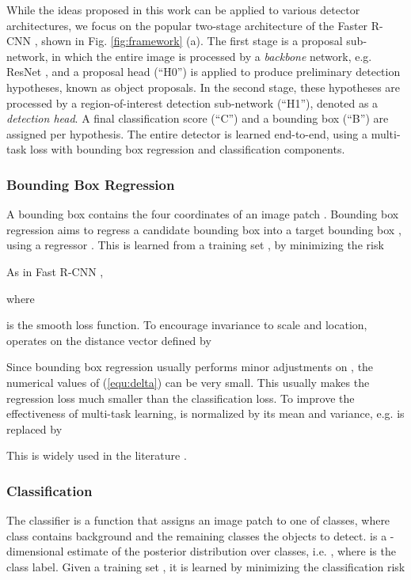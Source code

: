 \documentclass[10pt,journal,compsoc]{IEEEtran}
\begin{document}
While the ideas proposed in this work can be applied
to various detector architectures, we focus on the popular two-stage
architecture of the Faster R-CNN \cite{DBLP:conf/nips/RenHGS15}, shown in
Fig. \ref{fig:framework} (a). The first stage is a proposal sub-network,
in which the entire image is processed by a {\it backbone\/} network,
e.g. ResNet \cite{DBLP:conf/cvpr/HeZRS16}, and a proposal head (``H0'')
is applied to produce preliminary detection hypotheses, known as object
proposals. In the second stage, these
hypotheses are processed by a region-of-interest detection
sub-network (``H1''), denoted as a {\it detection head\/}. A final
classification score (``C'') and a bounding box (``B'') are assigned per
hypothesis. The entire detector is learned end-to-end, using a
multi-task loss with bounding box regression and classification
components.


\subsubsection{Bounding Box Regression}
\label{subsubsec:bbox}

A bounding box  contains the four coordinates of
an image patch . Bounding box regression aims to regress a
candidate bounding box  into a target
bounding box , using a regressor . This is
learned from a training set
, by minimizing the risk

As in Fast R-CNN \cite{DBLP:conf/iccv/Girshick15},

where

is the smooth  loss function.
To encourage invariance to scale and location,  operates on the
distance vector  defined by

Since bounding box regression usually performs minor adjustments
on , the numerical values of (\ref{equ:delta}) can be very
small. This usually makes the regression loss much smaller
than the classification loss. To improve the effectiveness of multi-task
learning,  is normalized by its mean and variance, e.g.
 is replaced by

This is widely used in the literature \cite{DBLP:conf/nips/RenHGS15,DBLP:conf/eccv/CaiFFV16,DBLP:conf/nips/DaiLHS16,lin2017feature,he2017mask}.


\subsubsection{Classification}

The classifier is a function  that assigns an image patch 
to one of  classes, where class  contains background and the remaining
classes the objects to detect.  is a -dimensional estimate
of the posterior distribution over classes, i.e. ,
where  is the class label. Given a training set , it is
learned by minimizing the classification risk
\end{document}
